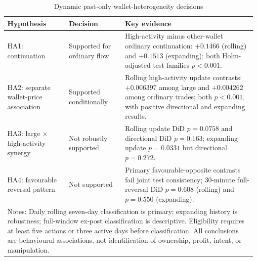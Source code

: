 \begin{table}[htbp]
\centering
\caption{Dynamic past-only wallet-heterogeneity decisions}
\label{tab:wallet-heterogeneity-decisions}
\small
\begin{tabular}{p{}p{}p{}}
\hline
Hypothesis & Decision & Key evidence \\
\hline
HA1: continuation & Supported for ordinary flow & High-activity minus other-wallet ordinary continuation: $+0.1466$ (rolling) and $+0.1513$ (expanding); both Holm-adjusted test families $p<0.001$. \\ \hline
HA2: separate wallet-price association & Supported conditionally & Rolling high-activity update contrasts: $+0.006397$ among large and $+0.004262$ among ordinary trades; both $p<0.001$, with positive directional and expanding results. \\ \hline
HA3: large $\times$ high-activity synergy & Not robustly supported & Rolling update DiD $p=0.0758$ and directional DiD $p=0.163$; expanding update $p=0.0331$ but directional $p=0.272$. \\ \hline
HA4: favourable reversal pattern & Not supported & Primary favourable-opposite contrasts fail joint test consistency; 30-minute full-reversal DiD $p=0.608$ (rolling) and $p=0.550$ (expanding). \\ \hline
\multicolumn{3}{p{0.94\textwidth}}{\footnotesize Notes: Daily rolling seven-day classification is primary; expanding history is robustness; full-window ex-post classification is descriptive. Eligibility requires at least five actions or three active days before classification. All conclusions are behavioural associations, not identification of ownership, profit, intent, or manipulation.}
\end{tabular}
\end{table}
